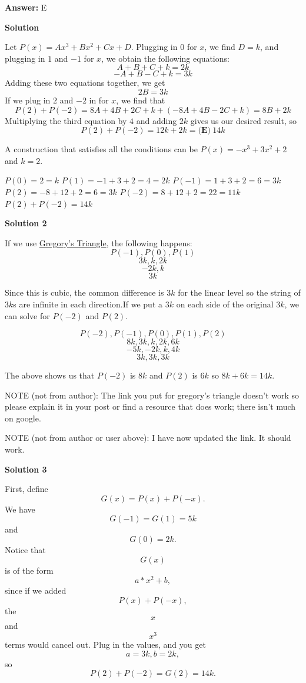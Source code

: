 \begin{enumerate}
 \textbf{Answer: }E



\textbf{Solution}

Let $P(x) = Ax^3+Bx^2 + Cx+D$.   Plugging in $0$ for $x$, we find $D=k$, and plugging in $1$ and $-1$ for $x$, we obtain the following equations:
 \[A+B+C+k=2k\]
 \[-A+B-C+k=3k\]Adding these two equations together, we get
 \[2B=3k\]If we plug in $2$ and $-2$ in for $x$, we find that 
 \[P(2)+P(-2) = 8A+4B+2C+k+(-8A+4B-2C+k)=8B+2k\]Multiplying the third equation by $4$ and adding $2k$ gives us our desired result, so 
 \[P(2)+P(-2)=12k+2k=\boxed{\textbf{(E)}\ 14k}\]

 A construction that satisfies all the conditions can be $P(x)=-x^3+3x^2+2$ and $k=2$.

 $P(0)=2=k$
$P(1)=-1+3+2=4=2k$
$P(-1)=1+3+2=6=3k$
$P(2)=-8+12+2=6=3k$
$P(-2)=8+12+2=22=11k$
$P(2)+P(-2)=14k$




\textbf{Solution 2}

If we use \href{https://artofproblemsolving.com/wiki/index.php?title=Gregory\%27s\_Triangle}{Gregory's Triangle}, the following happens:
 \[P(-1), P(0), P(1)\]
 \[3k ,  k  ,  2k\]
 \[-2k , k\]
 \[3k\]

 Since this is cubic, the common difference is $3k$ for the linear level so the string of $3k$s are infinite in each direction.If we put a $3k$ on each side of the original $3k$, we can solve for $P(-2)$ and $P(2)$.

 
 \[P(-2), P(-1), P(0), P(1), P(2)\]
 \[8k ,   3k ,  k  ,  2k ,  6k\]
 \[-5k  , -2k ,  k  ,  4k\]
 \[3k   ,  3k ,  3k\]

 The above shows us that $P(-2)$ is $8k$ and $P(2)$ is $6k$ so $8k+6k=14k$.

 NOTE (not from author): The link you put for gregory's triangle doesn't work so please explain it in your post or find a resource that does work; there isn't much on google.

 NOTE (not from author or user above): I have now updated the link. It should work.

 



\textbf{Solution 3}

First, define 
 \[G(x)=P(x)+P(-x).\] We have 
 \[G(-1)=G(1)=5k\] and 
 \[G(0)=2k.\] Notice that 
 \[G(x)\] is of the form 
 \[a*x^2+b,\] since if we added 
 \[P(x)+P(-x),\] the 
 \[x\] and 
 \[x^3\] terms would cancel out. Plug in the values, and you get 
 \[a=3k, b=2k,\] so 
 \[P(2)+P(-2)=G(2)=14k.\]


\end{enumerate}
